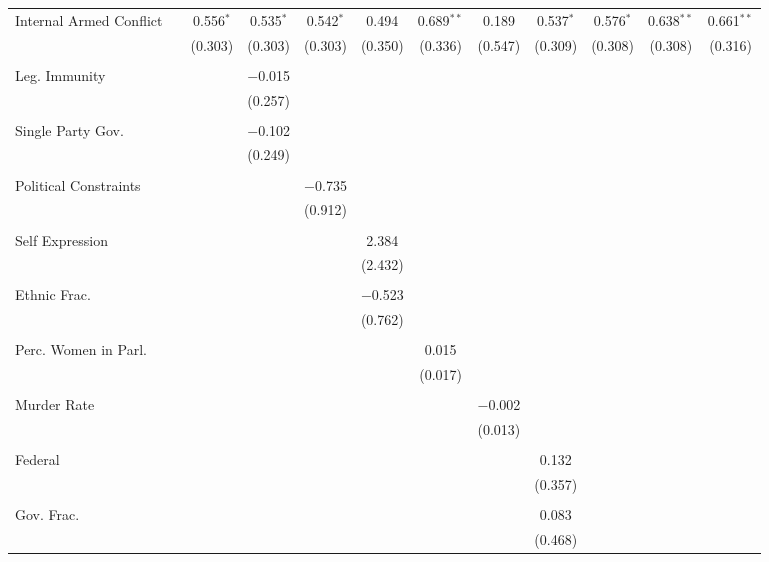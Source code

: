 \documentclass[a4paper]{article}\usepackage[]{graphicx}\usepackage[]{color}
\begin{document}
\begin{table}[H]
\begin{center}
{{\begin{tabular}{@{\extracolsep{5pt}}lccccccccccc}
 Internal Armed Conflict &  & 0.556$^{*}$ & 0.535$^{*}$ & 0.542$^{*}$ & 0.494 & 0.689$^{**}$ & 0.189 & 0.537$^{*}$ & 0.576$^{*}$ & 0.638$^{**}$ & 0.661$^{**}$ \\ 
  &  & (0.303) & (0.303) & (0.303) & (0.350) & (0.336) & (0.547) & (0.309) & (0.308) & (0.308) & (0.316) \\ 
  & & & & & & & & & & & \\ 
 Leg. Immunity &  &  & $-$0.015 &  &  &  &  &  &  &  &  \\ 
  &  &  & (0.257) &  &  &  &  &  &  &  &  \\ 
  & & & & & & & & & & & \\ 
 Single Party Gov. &  &  & $-$0.102 &  &  &  &  &  &  &  &  \\ 
  &  &  & (0.249) &  &  &  &  &  &  &  &  \\ 
  & & & & & & & & & & & \\ 
 Political Constraints &  &  &  & $-$0.735 &  &  &  &  &  &  &  \\ 
  &  &  &  & (0.912) &  &  &  &  &  &  &  \\ 
  & & & & & & & & & & & \\ 
 Self Expression &  &  &  &  & 2.384 &  &  &  &  &  &  \\ 
  &  &  &  &  & (2.432) &  &  &  &  &  &  \\ 
  & & & & & & & & & & & \\ 
 Ethnic Frac. &  &  &  &  & $-$0.523 &  &  &  &  &  &  \\ 
  &  &  &  &  & (0.762) &  &  &  &  &  &  \\ 
  & & & & & & & & & & & \\ 
 Perc. Women in Parl. &  &  &  &  &  & 0.015 &  &  &  &  &  \\ 
  &  &  &  &  &  & (0.017) &  &  &  &  &  \\ 
  & & & & & & & & & & & \\ 
 Murder Rate &  &  &  &  &  &  & $-$0.002 &  &  &  &  \\ 
  &  &  &  &  &  &  & (0.013) &  &  &  &  \\ 
  & & & & & & & & & & & \\ 
 Federal &  &  &  &  &  &  &  & 0.132 &  &  &  \\ 
  &  &  &  &  &  &  &  & (0.357) &  &  &  \\ 
  & & & & & & & & & & & \\ 
 Gov. Frac. &  &  &  &  &  &  &  & 0.083 &  &  &  \\ 
  &  &  &  &  &  &  &  & (0.468) &  &  &  \\ 

\end{tabular}}}
\end{center}
\end{table}
\end{document}
